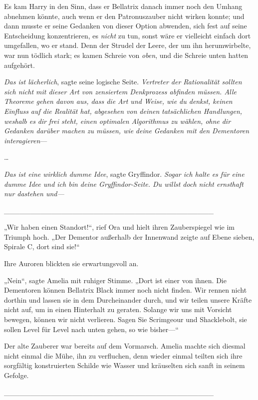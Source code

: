 {Es kam Harry in den Sinn, dass er Bellatrix danach immer noch den Umhang abnehmen könnte, auch wenn er den Patronuszauber nicht wirken konnte; und dann musste er seine Gedanken von dieser Option abwenden, sich fest auf seine Entscheidung konzentrieren, es \emph{nicht} zu tun, sonst wäre er vielleicht einfach dort umgefallen, wo er stand. Denn der Strudel der Leere, der um ihn herumwirbelte, war nun tödlich stark; es kamen Schreie von \emph{oben}, und die Schreie unten hatten aufgehört.

\emph{Das ist lächerlich}, sagte seine logische Seite. \emph{Vertreter der Rationalität sollten sich nicht mit dieser Art von zensiertem Denkprozess abfinden müssen. Alle Theoreme gehen davon aus, dass die Art und Weise, wie du denkst, keinen Einfluss auf die Realität hat, abgesehen von} \emph{deinen} \emph{tatsächlichen Handlungen, weshalb es} \emph{dir} \emph{frei steht, einen optimalen Algorithmus zu wählen, ohne} \emph{dir} \emph{Gedanken darüber machen zu müssen, wie} \emph{deine} \emph{Gedanken mit den Dementoren interagieren}—

…

\emph{Das ist eine wirklich dumme Idee}, sagte Gryffindor. \emph{Sogar ich halte es für eine dumme Idee und ich bin deine Gryffindor-Seite. Du willst doch nicht ernsthaft nur dastehen und—}

\_\_\_\_\_\_\_\_\_\_\_\_\_\_\_\_\_\_\_\_\_\_\_\_\_\_\_\_\_\_\_\_\_\_\_\_\_\_\_\_

„Wir haben einen Standort!“, rief Ora und hielt ihren Zauberspiegel wie im Triumph hoch. „Der Dementor außerhalb der Innenwand zeigte auf Ebene sieben, Spirale C, dort sind sie!“

Ihre Auroren blickten sie erwartungsvoll an.

„Nein“, sagte Amelia mit ruhiger Stimme. „Dort ist einer von ihnen. Die Dementoren können Bellatrix Black immer noch nicht finden. Wir rennen nicht dorthin und lassen sie in dem Durcheinander durch, und wir teilen unsere Kräfte nicht auf, um in einen Hinterhalt zu geraten. Solange wir uns mit Vorsicht bewegen, können wir nicht verlieren. Sagen Sie Scrimgeour und Shacklebolt, sie sollen Level für Level nach unten gehen, so wie bisher—“

Der alte Zauberer war bereits auf dem Vormarsch. Amelia machte sich diesmal nicht einmal die Mühe, ihn zu verfluchen, denn wieder einmal teilten sich ihre sorgfältig konstruierten Schilde wie Wasser und kräuselten sich sanft in seinem Gefolge.

\_\_\_\_\_\_\_\_\_\_\_\_\_\_\_\_\_\_\_\_\_\_\_\_\_\_\_\_\_\_\_\_\_\_\_\_\_\_\_\_

}

